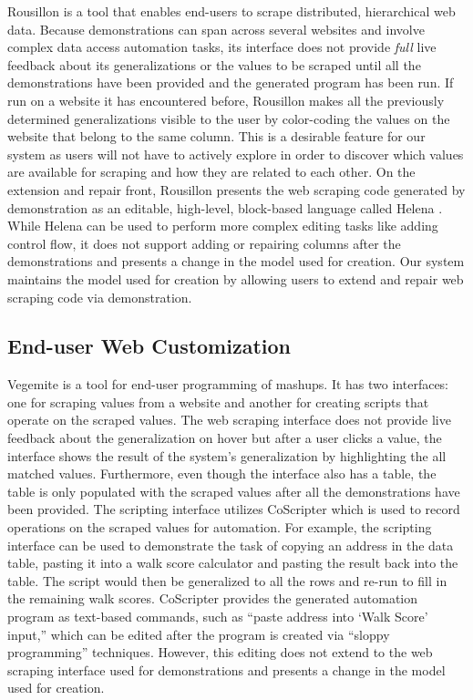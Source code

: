 \documentclass[sigconf,10pt]{acmart}
\begin{document}
Rousillon \citep{chasins2018} is a tool that enables end-users to scrape
distributed, hierarchical web data. Because demonstrations can span
across several websites and involve complex data access automation
tasks, its interface does not provide \emph{full} live feedback about
its generalizations or the values to be scraped until all the
demonstrations have been provided and the generated program has been
run. If run on a website it has encountered before, Rousillon makes all
the previously determined generalizations visible to the user by
color-coding the values on the website that belong to the same column.
This is a desirable feature for our system as users will not have to
actively explore in order to discover which values are available for
scraping and how they are related to each other. On the extension and
repair front, Rousillon presents the web scraping code generated by
demonstration as an editable, high-level, block-based language called
Helena \citep{zotero-51}. While Helena can be used to perform more
complex editing tasks like adding control flow, it does not support
adding or repairing columns after the demonstrations and presents a
change in the model used for creation. Our system maintains the model
used for creation by allowing users to extend and repair web scraping
code via demonstration.

\hypertarget{end-user-web-customization}{%
\subsection{End-user Web
Customization}\label{end-user-web-customization}}

Vegemite \citep{lin2009} is a tool for end-user programming of mashups.
It has two interfaces: one for scraping values from a website and
another for creating scripts that operate on the scraped values. The web
scraping interface does not provide live feedback about the
generalization on hover but after a user clicks a value, the interface
shows the result of the system's generalization by highlighting the all
matched values. Furthermore, even though the interface also has a table,
the table is only populated with the scraped values after all the
demonstrations have been provided. The scripting interface utilizes
CoScripter \citep{leshed2008} which is used to record operations on the
scraped values for automation. For example, the scripting interface can
be used to demonstrate the task of copying an address in the data table,
pasting it into a walk score calculator and pasting the result back into
the table. The script would then be generalized to all the rows and
re-run to fill in the remaining walk scores. CoScripter provides the
generated automation program as text-based commands, such as ``paste
address into `Walk Score' input,'' which can be edited after the program
is created via ``sloppy programming'' \citep{lin2009} techniques.
However, this editing does not extend to the web scraping interface used
for demonstrations and presents a change in the model used for creation.
\end{document}
